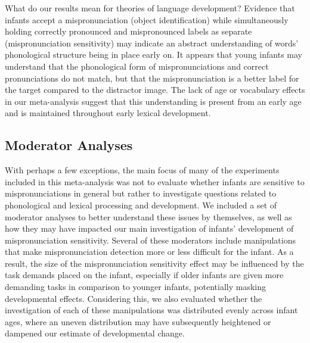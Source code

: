 \documentclass[man]{apa6}
\begin{document}
What do our results mean for theories of language development? Evidence that infants accept a mispronunciation (object identification) while simultaneously holding correctly pronounced and mispronounced labels as separate (mispronunciation sensitivity) may indicate an abstract understanding of words' phonological structure being in place early on. It appears that young infants may understand that the phonological form of mispronunciations and correct pronunciations do not match, but that the mispronunciation is a better label for the target compared to the distractor image. The lack of age or vocabulary effects in our meta-analysis suggest that this understanding is present from an early age and is maintained throughout early lexical development.

\hypertarget{moderator-analyses-1}{%
\subsection{Moderator Analyses}\label{moderator-analyses-1}}

With perhaps a few exceptions, the main focus of many of the experiments included in this meta-analysis was not to evaluate whether infants are sensitive to mispronunciations in general but rather to investigate questions related to phonological and lexical processing and development. We included a set of moderator analyses to better understand these issues by themselves, as well as how they may have impacted our main investigation of infants' development of mispronunciation sensitivity. Several of these moderators include manipulations that make mispronunciation detection more or less difficult for the infant. As a result, the size of the mispronunciation sensitivity effect may be influenced by the task demands placed on the infant, especially if older infants are given more demanding tasks in comparison to younger infants, potentially masking developmental effects. Considering this, we also evaluated whether the investigation of each of these manipulations was distributed evenly across infant ages, where an uneven distribution may have subsequently heightened or dampened our estimate of developmental change.
\end{document}

